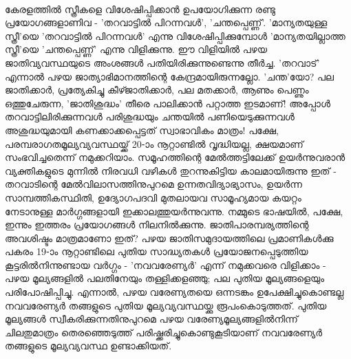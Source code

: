 \paragraph{}
കേരളത്തിൽ സ്ത്രീകളെ വിശേഷിപ്പിക്കാൻ ഉപയോഗിക്കുന്ന രണ്ടു പ്രയോഗങ്ങളാണിവ - 'തറവാട്ടിൽ പിറന്നവൾ', 'ചന്തപ്പെണ്ണ്'. 'മാന്യതയുള്ള സ്ത്രീ'യെ 'തറവാട്ടിൽ പിറന്നവൾ' എന്നു വിശേഷിപ്പിക്കുമ്പോൾ 'മാന്യതയില്ലാത്ത സ്ത്രീ'യെ 'ചന്തപ്പെണ്ണ്' എന്നു വിളിക്കുന്നു. ഈ വിളിയിൽ പഴയ ജാതിവ്യവസ്ഥയുടെ അംശങ്ങൾ പതിയിരിക്കുന്നുണ്ടെന്നു തീർച്ച. 'തറവാട്' എന്നാൽ പഴയ ജാത്യാഭിമാനത്തിന്റെ കേന്ദ്രമായിരുന്നല്ലോ. 'ചന്ത'യോ? പല ജാതിക്കാർ, പ്രത്യേകിച്ചു കീഴ്ജാതിക്കാർ, പല മതക്കാർ, ആണും പെണ്ണും ഒത്തുചേരുന്ന, 'ജാതിശുദ്ധം' തീരെ പാലിക്കാൻ പറ്റാത്ത ഇടമാണ്! അപ്പോൾ തറവാട്ടിലിരിക്കുന്നവൾ പരിശുദ്ധയും ചന്തയിൽ പണിയെടുക്കുന്നവൾ അശുദ്ധയുമായി കണക്കാക്കപ്പെട്ടത് സ്വാഭാവികം മാത്രം! പക്ഷേ, പരമ്പരാഗതമൂല്യവ്യവസ്ഥയ്ക്ക് 20-ാം നൂറ്റാണ്ടിൽ വൃദ്ധിയല്ല, ക്ഷയമാണ് സംഭവിച്ചതെന്ന് നമുക്കറിയാം. സമൂഹത്തിന്റെ മേൽത്തട്ടിലേക്ക് ഉയർന്നുവരാൻ വ്യക്തികളുടെ മുന്നിൽ നിരവധി വഴികൾ തുറന്നുകിട്ടിയ കാലമായിരുന്നു ഇത് - തറവാടിന്റെ മേൽവിലാസത്തിനുപുറമെ ഉന്നതവിദ്യാഭ്യാസം, ഉയർന്ന സാമ്പത്തികസ്ഥിതി, ഉദ്യോഗപദവി മുതലായവ സാമൂഹ്യമായ കയറ്റം നേടാനുള്ള മാർഗ്ഗങ്ങളായി ഇക്കാലത്തുയർന്നുവന്നു. നമ്മുടെ ഭാഷയിൽ, പക്ഷേ, ഇന്നും ഇത്തരം പ്രയോഗങ്ങൾ നിലനിൽക്കുന്നു. ജാതിപാരമ്പര്യത്തിന്റെ അവശിഷ്ടം മാത്രമാണോ ഇത്? പഴയ ജാതിസമുദായത്തിലെ പ്രമാണികൾക്കു പകരം 19-ാം നൂറ്റാണ്ടിലെ പുതിയ സാദ്ധ്യതകൾ പ്രയോജനപ്പെടുത്തിയ കൂട്ടരിൽനിന്നുണ്ടായ വർഗ്ഗം - 'നവവരേണ്യർ' എന്ന് നമുക്കവരെ വിളിക്കാം - പഴയ മൂല്യങ്ങളിൽ പലതിനേയും തള്ളിക്കളഞ്ഞു; പല പുതിയ മൂല്യങ്ങളെയും പരിപോഷിപ്പിച്ചു. എന്നാൽ, പഴയ വരേണ്യതയെ ഒന്നടങ്കം ഉപേക്ഷിച്ചുകൊണ്ടല്ല നവവരേണ്യർ തങ്ങളുടെ പുതിയ മൂല്യവ്യവസ്ഥയ്ക്കു രൂപംകൊടുത്തത്. പുതിയ മൂല്യങ്ങൾ സ്വീകരിക്കുന്നതിനുപുറമെ പഴയ വരേണ്യമൂല്യങ്ങളിൽനിന്ന് ചിലതുമാത്രം തെരഞ്ഞെടുത്ത് പരിഷ്ക്കരിച്ചുകൊണ്ടുകൂടിയാണ് നവവരേണ്യർ തങ്ങളുടെ മൂല്യവ്യവസ്ഥ ഉണ്ടാക്കിയത്.

